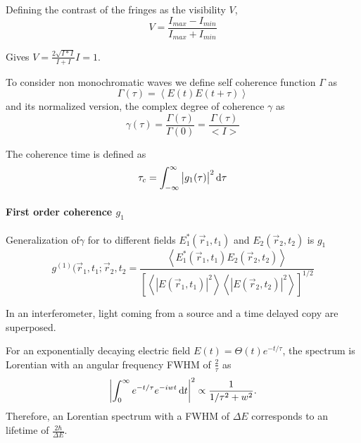 Defining the contrast of the fringes as the visibility $V$,
\begin{equation}
	V=\frac{I_{max}-I_{min}}{I_{max}+I_{min}}
\end{equation} 

Gives $V=\frac{2\sqrt{I*I}}{I+I}I=1$.

To consider non monochromatic waves we define self coherence function $\Gamma$ as 
\begin{equation}
\Gamma(\tau)=\left< E(t)E(t+\tau)\right>
\end{equation}
and its normalized version, the complex degree of coherence $\gamma$ as
\begin{equation}
\gamma(\tau)=\frac{\Gamma(\tau)}{\Gamma(0)} =  \frac{\Gamma(\tau)}{<I>}
\end{equation}



The coherence time is defined as 
\begin{equation}
\tau_c = \int_{-\infty}^{\infty} \left| g_1(\tau)\right|^2 \operatorname{\mathrm{d}\!} \tau 
\end{equation}





\paragraph{First order coherence $g_1$}
Generalization of$\gamma$  for to different fields  $E_1^*(\vec{r}_1,t_1)$ and $E_2(\vec{r}_2,t_2)$ is $g_1$
\begin{equation}
	g^{(1)}(\vec{r}_1,t_1;\vec{r}_2,t_2= \frac
	{\left< E_1^*(\vec{r}_1,t_1)E_2(\vec{r}_2,t_2) \right>}
	{\left[ \left<\left | E(\vec{r}_1,t_1)\right |^2 \right> \left< \left |E(\vec{r}_2,t_2)\right |^2 \right>\right]^{1/2}}	
\end{equation}






In an interferometer, light coming from a source and a time delayed copy are superposed.



For an exponentially decaying electric field $E(t)=\Theta(t)e^{-t/\tau}$, the spectrum is Lorentian with an angular frequency FWHM of $\frac{2}{\tau}$ as 
\begin{equation*}
\left|\int_{0}^{\infty}  e^{-t/\tau} e^{-iwt} \dif t \right|^2 \propto  \frac{1}{1/\tau^2+w^2} .
\end{equation*}
Therefore, an Lorentian spectrum with a FWHM of $\Delta E$ corresponds to an lifetime of $\frac{2\hbar}{\Delta E}$.

